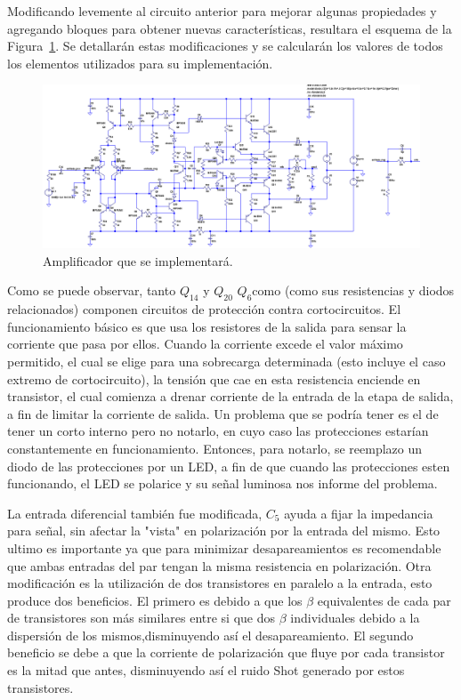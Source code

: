 Modificando levemente al circuito anterior para mejorar algunas propiedades y agregando bloques para obtener nuevas características, resultara el esquema de la Figura~\ref{im:circuito}. Se detallarán estas modificaciones y se calcularán los valores de todos los elementos utilizados para su implementación.

\begin{figure}[H]
\centering
\includegraphics[width=\textwidth]{img/circuito.png}
\caption{Amplificador que se implementará.}
\label{im:circuito} 
\end{figure}


Como se puede observar, tanto $Q_{14}$ y $Q_{20}$ $Q_{6}$como (como sus resistencias y diodos relacionados) componen circuitos de protección contra cortocircuitos. El funcionamiento básico es que usa los resistores de la salida para sensar la corriente que pasa por ellos. Cuando la corriente excede el valor máximo permitido, el cual se elige para una sobrecarga determinada (esto incluye el caso extremo de cortocircuito), la tensión que cae en esta resistencia enciende en transistor, el cual comienza a drenar corriente de la entrada de la etapa de salida, a fin de limitar la corriente de salida.
Un problema que se podría tener es el de tener un corto interno pero no notarlo, en cuyo caso las protecciones estarían constantemente en funcionamiento. Entonces, para notarlo, se reemplazo un diodo de las protecciones por un LED, a fin de que cuando las protecciones esten funcionando, el LED se polarice y su señal luminosa nos informe del problema.

La entrada diferencial también fue modificada, $C_5$ ayuda a fijar la impedancia para señal, sin afectar la "vista" en polarización por la entrada del mismo. Esto ultimo es importante ya que para minimizar desapareamientos es recomendable que ambas entradas del par tengan la misma resistencia en polarización. Otra modificación es la utilización de dos transistores en paralelo a la entrada, esto produce dos beneficios. El primero es debido a que los $\beta$ equivalentes de cada par de transistores son más similares entre si que dos $\beta$ individuales debido a la dispersión de los mismos,disminuyendo así el desapareamiento. El segundo beneficio se debe a que la corriente de polarización que fluye por cada transistor es la mitad que antes, disminuyendo así el ruido Shot generado por estos transistores.


